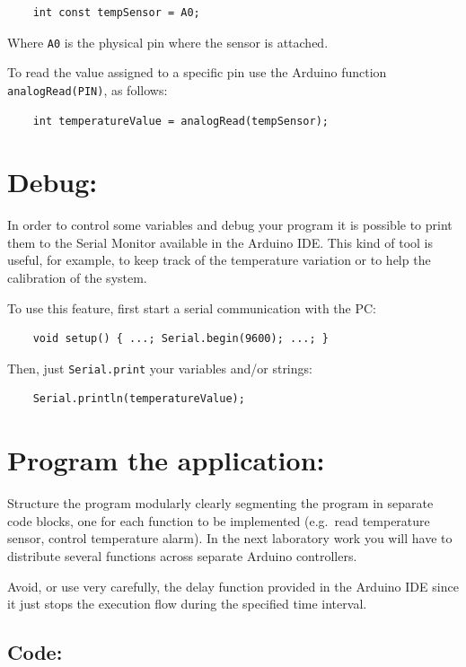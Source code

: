 \documentclass[10pt]{article}
\begin{document}
\begin{verbatim}
    int const tempSensor = A0;
\end{verbatim}

Where \texttt{A0} is the physical pin where the sensor is attached.

To read the value assigned to a specific pin use the Arduino function
\texttt{analogRead(PIN)}, as follows:

\begin{verbatim}
    int temperatureValue = analogRead(tempSensor);
\end{verbatim}

\section{Debug:}
In order to control some variables and debug your program it is possible to
print them to the Serial Monitor available in the Arduino IDE. This kind of tool
is useful, for example, to keep track of the temperature variation or to help
the calibration of the system.

To use this feature, first start a serial communication with the PC:

\begin{verbatim}
    void setup() { ...; Serial.begin(9600); ...; }
\end{verbatim}

Then, just \texttt{Serial.print} your variables and/or strings:
\begin{verbatim}
    Serial.println(temperatureValue);
\end{verbatim}



\section{Program the application:}


Structure the program modularly clearly segmenting the program in separate code
blocks, one for each function to be implemented (e.g.\ read temperature sensor,
control temperature alarm).  In the next laboratory work you will have to
distribute several functions across separate Arduino controllers.

Avoid, or use very carefully, the delay function provided in the Arduino IDE
since it just stops the execution flow during the specified time interval.

\subsection{Code:}
\end{document}
